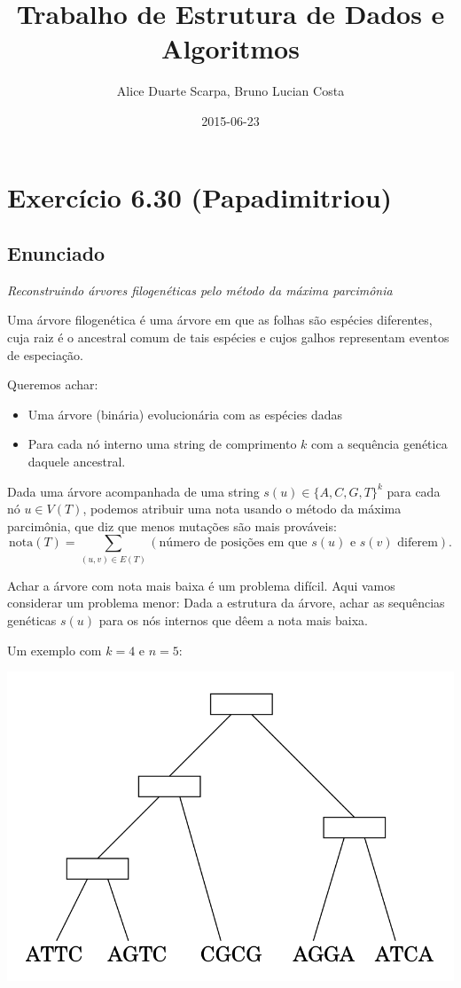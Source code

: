 \documentclass[11pt]{article}
\author{Alice Duarte Scarpa, Bruno Lucian Costa}
\date{2015-06-23}
\title{Trabalho de Estrutura de Dados e Algoritmos}
\begin{document}
\maketitle

\section{Exercício 6.30 (Papadimitriou)}
\label{sec-1}
\subsection{Enunciado}
\label{sec-1-1}

\textit{Reconstruindo árvores filogenéticas pelo método da máxima parcimônia}

Uma árvore filogenética é uma árvore em que as folhas são espécies
diferentes, cuja raiz é o ancestral comum de tais espécies e cujos
galhos representam eventos de especiação.

Queremos achar:

\begin{itemize}
\item Uma árvore (binária) evolucionária com as espécies dadas
\item Para cada nó interno uma string de comprimento $k$ com a
sequência genética daquele ancestral.
\end{itemize}


Dada uma árvore acompanhada de uma string $s(u) \in \{A, C, G, T\}^k$ para
cada nó $u \in V(T)$, podemos atribuir uma nota usando o método da
máxima parcimônia, que diz que menos mutações são mais prováveis:
\[ \mathrm{nota}(T) = \sum_{(u,v) \in E(T)} (\text{número de posições em que }s(u)\text{ e }s(v)\text{ diferem}). \]

Achar a árvore com nota mais baixa é um problema difícil. Aqui vamos
considerar um problema menor: Dada a estrutura da árvore, achar as
sequências genéticas $s(u)$ para os nós internos que dêem a nota mais
baixa.

Um exemplo com $k = 4$ e $n = 5$:

\href{http:github.com/adusca/FGV-EDA/6_30/tree.png}{\includegraphics[width=.9\linewidth]{6_30/tree.png}}
\end{document}
